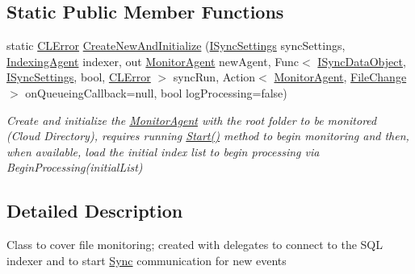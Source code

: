 \subsection*{Static Public Member Functions}
\begin{DoxyCompactItemize}
\item 
static \hyperlink{class_cloud_api_public_1_1_model_1_1_c_l_error}{C\-L\-Error} \hyperlink{class_cloud_api_public_1_1_file_monitor_1_1_monitor_agent_ac5e74f86eea231c2f46d16cc2f926fb2}{Create\-New\-And\-Initialize} (\hyperlink{interface_cloud_api_public_1_1_interfaces_1_1_i_sync_settings}{I\-Sync\-Settings} sync\-Settings, \hyperlink{class_cloud_api_public_1_1_s_q_l_indexer_1_1_indexing_agent}{Indexing\-Agent} indexer, out \hyperlink{class_cloud_api_public_1_1_file_monitor_1_1_monitor_agent}{Monitor\-Agent} new\-Agent, Func$<$ \hyperlink{interface_cloud_api_public_1_1_interfaces_1_1_i_sync_data_object}{I\-Sync\-Data\-Object}, \hyperlink{interface_cloud_api_public_1_1_interfaces_1_1_i_sync_settings}{I\-Sync\-Settings}, bool, \hyperlink{class_cloud_api_public_1_1_model_1_1_c_l_error}{C\-L\-Error} $>$ sync\-Run, Action$<$ \hyperlink{class_cloud_api_public_1_1_file_monitor_1_1_monitor_agent}{Monitor\-Agent}, \hyperlink{class_cloud_api_public_1_1_model_1_1_file_change}{File\-Change} $>$ on\-Queueing\-Callback=null, bool log\-Processing=false)
\begin{DoxyCompactList}\small\item\em Create and initialize the \hyperlink{class_cloud_api_public_1_1_file_monitor_1_1_monitor_agent}{Monitor\-Agent} with the root folder to be monitored (Cloud Directory), requires running \hyperlink{class_cloud_api_public_1_1_file_monitor_1_1_monitor_agent_a7fd0bcb1837d5a27a32385232f6f463b}{Start()} method to begin monitoring and then, when available, load the initial index list to begin processing via Begin\-Processing(initial\-List) \end{DoxyCompactList}\end{DoxyCompactItemize}


\subsection{Detailed Description}
Class to cover file monitoring; created with delegates to connect to the S\-Q\-L indexer and to start \hyperlink{namespace_cloud_api_public_1_1_sync}{Sync} communication for new events 




